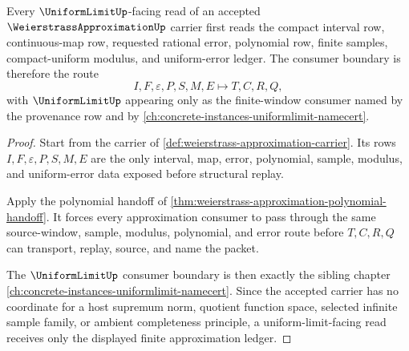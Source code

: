 \begin{theorem}
\label{thm:weierstrass-approximation-uniformlimit-consumer}
Every $\UniformLimitUp$-facing read of an accepted $\WeierstrassApproximationUp$ carrier first reads the compact interval row, continuous-map row, requested rational error, polynomial row, finite samples, compact-uniform modulus, and uniform-error ledger. The consumer boundary is therefore the route
$$
I,F,\varepsilon,P,S,M,E \longmapsto T,C,R,Q,
$$
with $\UniformLimitUp$ appearing only as the finite-window consumer named by the provenance row and by \autoref{ch:concrete-instances-uniformlimit-namecert}.
\end{theorem}
\begin{proof}
Start from the carrier of \autoref{def:weierstrass-approximation-carrier}. Its rows $I,F,\varepsilon,P,S,M,E$ are the only interval, map, error, polynomial, sample, modulus, and uniform-error data exposed before structural replay.

Apply the polynomial handoff of \autoref{thm:weierstrass-approximation-polynomial-handoff}. It forces every approximation consumer to pass through the same source-window, sample, modulus, polynomial, and error route before $T,C,R,Q$ can transport, replay, source, and name the packet.

The $\UniformLimitUp$ consumer boundary is then exactly the sibling chapter \autoref{ch:concrete-instances-uniformlimit-namecert}. Since the accepted carrier has no coordinate for a host supremum norm, quotient function space, selected infinite sample family, or ambient completeness principle, a uniform-limit-facing read receives only the displayed finite approximation ledger.
\end{proof}


